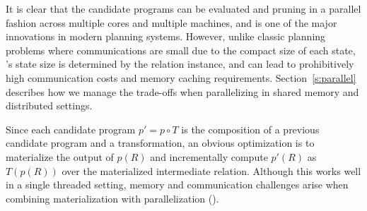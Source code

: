 % 


 It is clear that the candidate programs can be evaluated and pruning in a parallel fashion across multiple cores and multiple machines, and is one of the major innovations in modern planning systems.  However, unlike classic planning problems where communications are small due to the compact size of each state, \sys's state size is determined by the relation instance, and can lead to prohibitively high communication costs and memory caching requirements.   Section~\ref{s:parallel} describes how we manage the trade-offs when parallelizing \sys in shared memory and distributed settings.

 Since each candidate program $p' = p\circ T$ is the composition of a previous candidate program and a transformation, an obvious optimization is to materialize the output of $p(R)$ and incrementally compute $p'(R)$ as $T(p(R))$ over the materialized intermediate relation.  Although this works well in a single threaded setting, memory and communication challenges arise when combining materialization with parallelization ().






